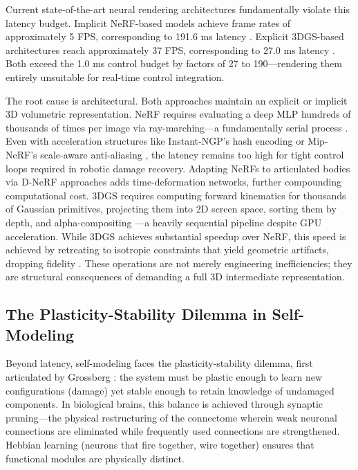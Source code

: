\documentclass[12pt,a4paper,oneside]{report}
\begin{document}
Current state-of-the-art neural rendering architectures fundamentally violate this latency budget. Implicit NeRF-based models achieve frame rates of approximately 5 FPS, corresponding to 191.6 ms latency \cite{hu2024teaching}. Explicit 3DGS-based architectures reach approximately 37 FPS, corresponding to 27.0 ms latency \cite{hu2025learning}. Both exceed the 1.0 ms control budget by factors of 27 to 190—rendering them entirely unsuitable for real-time control integration.

The root cause is architectural. Both approaches maintain an explicit or implicit 3D volumetric representation. NeRF requires evaluating a deep MLP hundreds of thousands of times per image via ray-marching—a fundamentally serial process \cite{mildenhall2020nerf}. Even with acceleration structures like Instant-NGP's hash encoding \cite{muller2022instant} or Mip-NeRF's scale-aware anti-aliasing \cite{barron2021mip}, the latency remains too high for tight control loops required in robotic damage recovery. Adapting NeRFs to articulated bodies via D-NeRF approaches \cite{pumarola2021d} adds time-deformation networks, further compounding computational cost. 3DGS requires computing forward kinematics for thousands of Gaussian primitives, projecting them into 2D screen space, sorting them by depth, and alpha-compositing \cite{kerbl20233d}—a heavily sequential pipeline despite GPU acceleration. While 3DGS achieves substantial speedup over NeRF, this speed is achieved by retreating to isotropic constraints that yield geometric artifacts, dropping fidelity \cite{hu2025learning}. These operations are not merely engineering inefficiencies; they are structural consequences of demanding a full 3D intermediate representation.

\subsection{The Plasticity-Stability Dilemma in Self-Modeling}
\label{subsec:plasticity_stability}

Beyond latency, self-modeling faces the plasticity-stability dilemma, first articulated by Grossberg \cite{grossberg1987competitive}: the system must be plastic enough to learn new configurations (damage) yet stable enough to retain knowledge of undamaged components. In biological brains, this balance is achieved through synaptic pruning—the physical restructuring of the connectome wherein weak neuronal connections are eliminated while frequently used connections are strengthened. Hebbian learning (neurons that fire together, wire together) ensures that functional modules are physically distinct.
\end{document}
